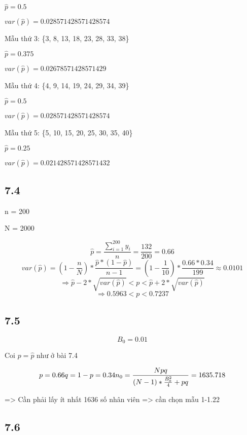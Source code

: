 \documentclass[
]{article}
\begin{document}
\(\hat{p} = 0.5\)

\(var(\hat{p}) = 0.028571428571428574\)

Mẫu thứ 3: \{3, 8, 13, 18, 23, 28, 33, 38\}

\(\hat{p} = 0.375\)

\(var(\hat{p}) = 0.02678571428571429\)

Mẫu thứ 4: \{4, 9, 14, 19, 24, 29, 34, 39\}

\(\hat{p} = 0.5\)

\(var(\hat{p}) = 0.028571428571428574\)

Mẫu thứ 5: \{5, 10, 15, 20, 25, 30, 35, 40\}

\(\hat{p} = 0.25\)

\(var(\hat{p}) = 0.021428571428571432\)

\hypertarget{section-3}{%
\subsection{7.4}\label{section-3}}

n = 200

N = 2000

\[\hat{p} = \frac{\sum_{i=1}^{200}y_i}{n} = \frac{132}{200}=0.66\]
\[var(\hat{p}) = (1-\frac n N)*\frac{\hat{p}*(1-\hat{p})}{n-1} = (1-\frac 1 {10})*\frac{0.66*0.34}{199} \approx 0.0101\]
\[\Rightarrow \hat{p} - 2*\sqrt{var(\hat{p})} < p < \hat{p} + 2*\sqrt{var(\hat{p})}\]
\[\Rightarrow 0.5963 < p < 0.7237\]

\hypertarget{section-4}{%
\subsection{7.5}\label{section-4}}

\[B_0 = 0.01\]

Coi \(p=\hat{p}\) như ở bài 7.4

\[
p = 0.66 \\
q = 1-p  = 0.34 \\
n_0 = \frac{Npq}{(N-1)*\frac{B_0^2}{4} + pq} = 1635.718
\]

=\textgreater{} Cần phải lấy ít nhất 1636 số nhân viên =\textgreater{}
cần chọn mẫu 1-1.22

\hypertarget{section-5}{%
\subsection{7.6}\label{section-5}}
\end{document}
